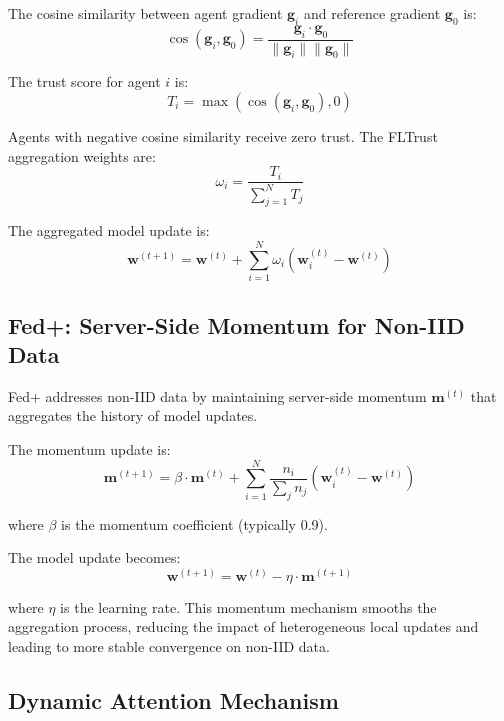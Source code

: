 \documentclass[conference]{IEEEtran}
\begin{document}
The cosine similarity between agent gradient $\mathbf{g}_i$ and reference gradient $\mathbf{g}_0$ is:
\begin{equation}
\cos(\mathbf{g}_i, \mathbf{g}_0) = \frac{\mathbf{g}_i \cdot \mathbf{g}_0}{\|\mathbf{g}_i\| \|\mathbf{g}_0\|}
\end{equation}

The trust score for agent $i$ is:
\begin{equation}
T_i = \max\left( \cos(\mathbf{g}_i, \mathbf{g}_0), 0 \right)
\end{equation}

Agents with negative cosine similarity receive zero trust. The FLTrust aggregation weights are:
\begin{equation}
\omega_i = \frac{T_i}{\sum_{j=1}^{N} T_j}
\end{equation}

The aggregated model update is:
\begin{equation}
\mathbf{w}^{(t+1)} = \mathbf{w}^{(t)} + \sum_{i=1}^{N} \omega_i (\mathbf{w}_i^{(t)} - \mathbf{w}^{(t)})
\end{equation}

\subsection{Fed+: Server-Side Momentum for Non-IID Data}

Fed+ \cite{fedplus} addresses non-IID data by maintaining server-side momentum $\mathbf{m}^{(t)}$ that aggregates the history of model updates.

The momentum update is:
\begin{equation}
\mathbf{m}^{(t+1)} = \beta \cdot \mathbf{m}^{(t)} + \sum_{i=1}^{N} \frac{n_i}{\sum_j n_j} (\mathbf{w}_i^{(t)} - \mathbf{w}^{(t)})
\end{equation}

where $\beta$ is the momentum coefficient (typically 0.9).

The model update becomes:
\begin{equation}
\mathbf{w}^{(t+1)} = \mathbf{w}^{(t)} - \eta \cdot \mathbf{m}^{(t+1)}
\end{equation}

where $\eta$ is the learning rate. This momentum mechanism smooths the aggregation process, reducing the impact of heterogeneous local updates and leading to more stable convergence on non-IID data.

\subsection{Dynamic Attention Mechanism}
\end{document}
